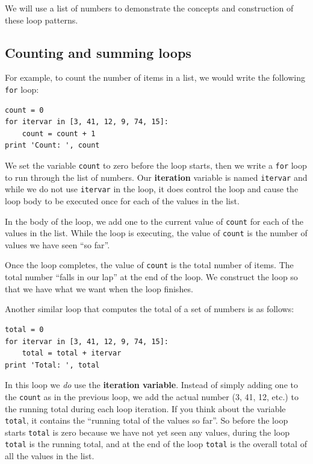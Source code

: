 \documentclass[10pt]{book}
\begin{document}
We will use a list of numbers to demonstrate the concepts and construction
of these loop patterns.  

\subsection{Counting and summing loops}

For example, to count the number of items
in a list, we would write the following {\tt for} loop:

\beforeverb
\begin{verbatim}
count = 0
for itervar in [3, 41, 12, 9, 74, 15]:
    count = count + 1
print 'Count: ', count
\end{verbatim}
\afterverb
%
We set the variable {\tt count} to zero before the loop starts,
then we write a {\tt for} loop to run through the list of numbers.
Our {\bf iteration} variable is named {\tt itervar} and while we do
not use {\tt itervar} in the loop, it does control the loop and cause
the loop body to be executed once for each of the values in the list.

In the body of the loop, we add one to the current value of {\tt count}
for each of the values in the list.  While the loop is executing, the 
value of {\tt count} is the number of values we have seen ``so far''.

Once the loop completes, the value of {\tt count} is the total number
of items.   The total number ``falls in our lap'' at the end of the 
loop.  We construct the loop so that we have what we want when the loop
finishes.

Another similar loop that computes the total of a set of numbers
is as follows:

\beforeverb
\begin{verbatim}
total = 0
for itervar in [3, 41, 12, 9, 74, 15]:
    total = total + itervar
print 'Total: ', total
\end{verbatim}
\afterverb
%
In this loop we \emph{do} use the {\bf iteration variable}.
Instead of simply adding one to the {\tt count} as in the previous loop, 
we add the actual number (3, 41, 12, etc.) to the running 
total during each loop iteration.
If you think about the variable {\tt total}, it contains the 
``running total of the values so far''.  So before the loop
starts {\tt total} is zero because we have not yet seen any values,
during the loop {\tt total} is the running total, and at the end of 
the loop {\tt total} is the overall total of all the values 
in the list.
\end{document}

